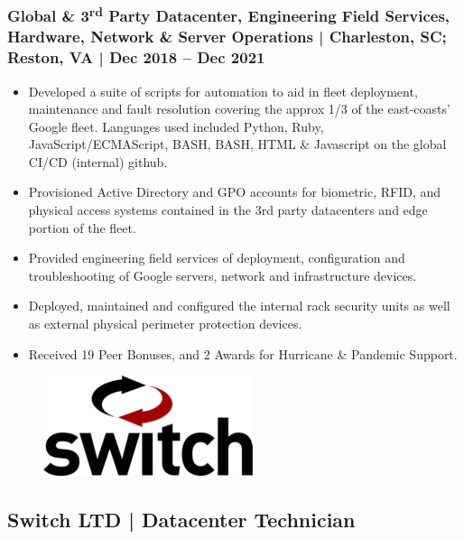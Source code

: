 \documentclass[letter,10pt]{article}
\begin{document}
\subsubsection*{Global \& 3\textsuperscript{rd} Party Datacenter, Engineering Field Services, Hardware, Network \& Server Operations | Charleston, SC; Reston, VA | Dec 2018 – Dec 2021}
\label{sec:org47e0ef8}
\begin{itemize}
\item Developed a suite of scripts for automation to aid in fleet deployment, maintenance and fault resolution covering the approx 1/3 of the east-coasts' Google fleet. Languages used included Python, Ruby, JavaScript/ECMAScript, BASH, BASH, HTML \& Javascript  on the global CI/CD (internal) github.
\item Provisioned Active Directory and GPO accounts for biometric, RFID, and physical access systems contained in the 3rd party datacenters and edge portion of the fleet.
\item Provided engineering field services of deployment, configuration and troubleshooting of Google servers, network and infrastructure devices.
\item Deployed, maintained and configured the internal rack security units as well as external physical perimeter protection devices.
\item Received 19 Peer Bonuses, and 2 Awards for Hurricane \& Pandemic Support.
\end{itemize}



\begin{figure}
\includegraphics[width=0.8\linewidth]{./img/50p_cr_switch.jpg}
\end{figure}

\subsection*{Switch LTD | Datacenter Technician}
\label{sec:org9373096}
\end{document}
